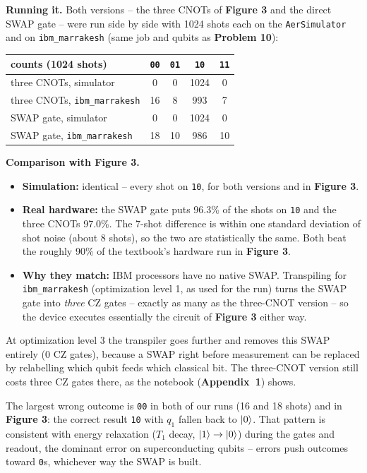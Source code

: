 \documentclass[a4paper, 10pt]{article}
\begin{document}
\begin{solution}
	\noindent \textbf{Running it.} Both versions -- the three CNOTs of \textbf{Figure 3} and the direct SWAP gate -- were run side by side with 1024 shots each on the \texttt{AerSimulator} and on \texttt{ibm\_marrakesh} (same job and qubits as \textbf{Problem 10}):
	\begin{center}
		\begin{tabular}{lcccc}
			\toprule
			counts (1024 shots)                  & \texttt{00} & \texttt{01} & \texttt{10} & \texttt{11} \\
			\midrule
			three CNOTs, simulator               & 0           & 0           & 1024        & 0           \\
			three CNOTs, \texttt{ibm\_marrakesh} & 16          & 8           & 993         & 7           \\
			SWAP gate, simulator                 & 0           & 0           & 1024        & 0           \\
			SWAP gate, \texttt{ibm\_marrakesh}   & 18          & 10          & 986         & 10          \\
			\bottomrule
		\end{tabular}
	\end{center}

	\noindent \textbf{Comparison with Figure 3.}
	\begin{itemize}
		\item \textbf{Simulation:} identical -- every shot on \texttt{10}, for both versions and in \textbf{Figure 3}.
		\item \textbf{Real hardware:} the SWAP gate puts 96.3\% of the shots on \texttt{10} and the three CNOTs 97.0\%. The 7-shot difference is within one standard deviation of shot noise (about 8 shots), so the two are statistically the same. Both beat the roughly 90\% of the textbook's hardware run in \textbf{Figure 3}.
		\item \textbf{Why they match:} IBM processors have no native SWAP. Transpiling for \texttt{ibm\_marrakesh} (optimization level 1, as used for the run) turns the SWAP gate into \emph{three} CZ gates -- exactly as many as the three-CNOT version -- so the device executes essentially the circuit of \textbf{Figure 3} either way.
	\end{itemize}
	At optimization level 3 the transpiler goes further and removes this SWAP entirely (0 CZ gates), because a SWAP right before measurement can be replaced by relabelling which qubit feeds which classical bit. The three-CNOT version still costs three CZ gates there, as the notebook (\textbf{Appendix~1}) shows.

	\begin{remark}
		The largest wrong outcome is \texttt{00} in both of our runs (16 and 18 shots) and in \textbf{Figure 3}: the correct result \texttt{10} with \( q_1 \) fallen back to \( \ket{0} \).
		That pattern is consistent with energy relaxation (\( T_1 \) decay, \( \ket{1} \to \ket{0} \)) during the gates and readout, the dominant error on superconducting qubits -- errors push outcomes toward \texttt{0}s, whichever way the SWAP is built.
	\end{remark}
\end{solution}
\end{document}
